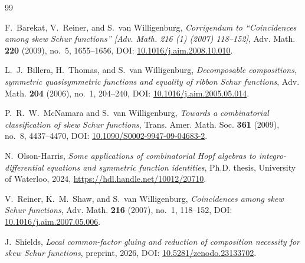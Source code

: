 \documentclass[11pt,a4paper]{amsart}
\numberwithin{equation}{section}
\theoremstyle{plain}
\theoremstyle{definition}
\begin{document}
\begin{thebibliography}{99}

F.~Barekat, V.~Reiner, and S.~van Willigenburg,
\emph{Corrigendum to ``Coincidences among skew Schur functions'' [Adv. Math. 216 (1) (2007) 118--152]},
Adv. Math. \textbf{220} (2009), no.~5, 1655--1656,
DOI: \href{https://doi.org/10.1016/j.aim.2008.10.010}{10.1016/\allowbreak j.aim.2008.10.010}.

L.~J.~Billera, H.~Thomas, and S.~van Willigenburg,
\emph{Decomposable compositions, symmetric quasisymmetric functions and equality of ribbon Schur functions},
Adv. Math. \textbf{204} (2006), no.~1, 204--240,
DOI: \href{https://doi.org/10.1016/j.aim.2005.05.014}{10.1016/\allowbreak j.aim.2005.05.014}.

P.~R.~W.~McNamara and S.~van Willigenburg,
\emph{Towards a combinatorial classification of skew Schur functions},
Trans. Amer. Math. Soc. \textbf{361} (2009), no.~8, 4437--4470,
DOI: \href{https://doi.org/10.1090/S0002-9947-09-04683-2}{10.1090/\allowbreak S0002-9947-09-04683-2}.

N.~Olson-Harris,
\emph{Some applications of combinatorial Hopf algebras to integro-differential equations and symmetric function identities},
Ph.D. thesis, University of Waterloo, 2024,
\url{https://hdl.handle.net/10012/20710}.

V.~Reiner, K.~M.~Shaw, and S.~van Willigenburg,
\emph{Coincidences among skew Schur functions},
Adv. Math. \textbf{216} (2007), no.~1, 118--152,
DOI: \href{https://doi.org/10.1016/j.aim.2007.05.006}{10.1016/\allowbreak j.aim.2007.05.006}.

J.~Shields,
\emph{Local common-factor gluing and reduction of composition necessity for skew Schur functions},
preprint, 2026,
DOI: \href{https://doi.org/10.5281/zenodo.23133702}{10.5281/\allowbreak zenodo.23133702}.
\end{thebibliography}
\end{document}
